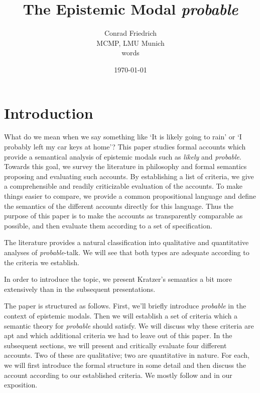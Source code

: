 \documentclass{article}
\title{The Epistemic Modal \emph{probable}}
\author{Conrad Friedrich \\ MCMP, LMU Munich \\ \wordcount words}
\date{\today}
\theoremstyle{definition}
\begin{document}

\maketitle

\tableofcontents
\newpage
\section{Introduction}

What do we mean when we say something like `It is likely going to rain' or `I probably left my car keys at home'?
This paper studies formal accounts which provide a semantical analysis of epistemic modals such as \emph{likely} and \emph{probable}.
Towards this goal, we survey the literature in philosophy and formal semantics proposing and evaluating such accounts.
By establishing a list of criteria, we give a comprehensible and readily criticizable evaluation of the accounts. To make things easier to compare, we provide a common propositional language and define the semantics of the different accounts directly for this language. Thus the purpose of this paper is to make the accounts as transparently comparable as possible, and then evaluate them according to a set of specification.

The literature provides a natural classification into qualitative and quantitative analyses of \emph{probable}-talk.
We will see that both types are adequate according to the criteria we establish.

In order to introduce the topic, we present Kratzer's semantics a bit more extensively than in the subsequent presentations.

The paper is structured as follows. First, we'll briefly introduce \emph{probable} in the context of epistemic modals. Then we will establish a set of criteria which a semantic theory for \emph{probable} should satisfy. We will discuss why these criteria are apt and which additional criteria we had to leave out of this paper. In the subsequent sections, we will present and critically evaluate four different accounts. Two of these are qualitative; two are quantitative in nature. For each, we will first introduce the formal structure in some detail and then discuss the account according to our established criteria. We mostly follow \textcite{yalcin10_probab_operat} and \textcite{holliday13_measur} in our exposition.
\end{document}
